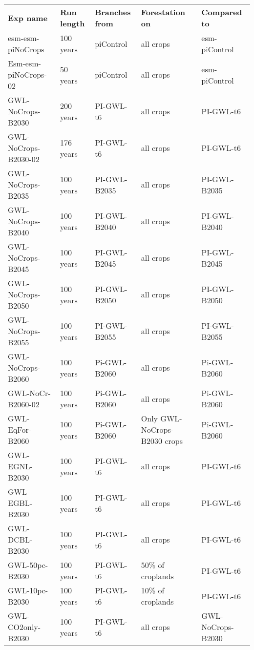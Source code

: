 \documentclass[]{article}
\begin{document}
\begin{table}[]
\begin{tabular}{lllll}
\hline
Exp name             & Run length & Branches from & Forestation on               & Compared to       \\ \hline
esm-esm-piNoCrops    & 100 years  & piControl     & all crops                    & esm-piControl     \\
Esm-esm-piNoCrops-02 & 50 years   & piControl     & all crops                    & esm-piControl     \\
GWL-NoCrops-B2030    & 200 years  & PI-GWL-t6     & all crops                    & PI-GWL-t6         \\
GWL-NoCrops-B2030-02 & 176 years  & PI-GWL-t6     & all crops                    & PI-GWL-t6         \\
GWL-NoCrops-B2035    & 100 years  & PI-GWL-B2035  & all crops                    & PI-GWL-B2035      \\
GWL-NoCrops-B2040    & 100 years  & PI-GWL-B2040  & all crops                    & PI-GWL-B2040      \\
GWL-NoCrops-B2045    & 100 years  & PI-GWL-B2045  & all crops                    & PI-GWL-B2045      \\
GWL-NoCrops-B2050    & 100 years  & PI-GWL-B2050  & all crops                    & PI-GWL-B2050      \\
GWL-NoCrops-B2055    & 100 years  & PI-GWL-B2055  & all crops                    & PI-GWL-B2055      \\
GWL-NoCrops-B2060    & 100 years  & Pi-GWL-B2060  & all crops                    & Pi-GWL-B2060      \\
GWL-NoCr-B2060-02    & 100 years  & Pi-GWL-B2060  & all crops                    & Pi-GWL-B2060      \\
GWL-EqFor-B2060      & 100 years  & Pi-GWL-B2060  & Only GWL-NoCrops-B2030 crops & Pi-GWL-B2060      \\
GWL-EGNL-B2030       & 100 years  & PI-GWL-t6     & all crops                    & PI-GWL-t6         \\
GWL-EGBL-B2030       & 100 years  & PI-GWL-t6     & all crops                    & PI-GWL-t6         \\
GWL-DCBL-B2030       & 100 years  & PI-GWL-t6     & all crops                    & PI-GWL-t6         \\
GWL-50pc-B2030       & 100 years  & PI-GWL-t6     & 50\% of croplands            & PI-GWL-t6         \\
GWL-10pc-B2030       & 100 years  & PI-GWL-t6     & 10\% of croplands            & PI-GWL-t6         \\
GWL-CO2only-B2030    & 100 years  & PI-GWL-t6     & all crops                    & GWL-NoCrops-B2030 \\ \hline
\end{tabular}
\end{table}
\end{document}
